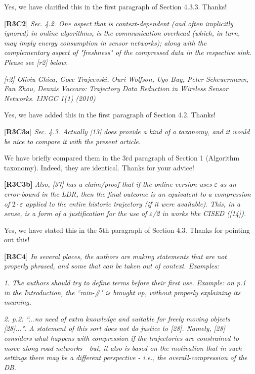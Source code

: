 \documentclass{letter}
\begin{document}
{Yes, we have clarified this in the first paragraph of Section 4.3.3. Thanks!

\textbf{[R3C2]} \emph{
Sec. 4.2. One aspect that is context-dependent (and often implicitly ignored) in online algorithms, is the communication overhead (which, in turn, may imply energy consumption in sensor networks); along with the complementary aspect of "freshness" of the compressed data in the respective sink. Please see [r2] below.}

\emph{[r2] Oliviu Ghica, Goce Trajcevski, Ouri Wolfson, Ugo Buy, Peter Scheuermann, Fan Zhou, Dennis Vaccaro: Trajectory Data Reduction in Wireless Sensor Networks. IJNGC 1(1) (2010)
}

Yes, we have added this in the first paragraph of Section 4.2. Thanks!

\textbf{[R3C3a]} \emph{
Sec. 4.3. Actually [13] does provide a kind of a taxonomy, and it would be nice to compare it with the present article. }

We have briefly compared them in the 3rd paragraph of Section 1 (Algorithm taxonomy). Indeed, they are identical. Thanks for your advice!

\textbf{[R3C3b]} \emph{Also, [37] has a claim/proof that if the online version uses $\varepsilon$ as an error-bound in the LDR, then the final outcome is an equivalent to a compression of $2 \cdot \varepsilon$ applied to the entire historic trajectory (if it were available). This, in a sense, is a form of a justification  for the use of $\varepsilon$/2 in works like CISED ([14]).}

Yes, we have stated this in the 5th paragraph of Section 4.3. Thanks for pointing out this!

\textbf{[R3C4]} \emph{
In several places, the authors are making statements that are not properly phrased, and some that can be taken out of context. Examples:}

\emph{1. The authors should try to define terms before their first use. Example: on p.1 in the Introduction, the ``min-\#" is brought up, without properly explaining its meaning.}


\emph{2. p.2: ``...no need of extra knowledge and suitable for freely moving objects [28]...". A statement of this sort does not do justice to [28].
Namely, [28] considers what happens with compression if the trajectories are constrained to move along road networks - but, it also is based on the motivation that in such settings there may be a different perspective - i.e., the overall-compression of the DB.}



}
\end{document}
